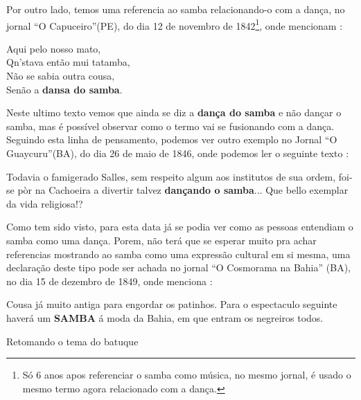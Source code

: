 Por outro lado, temos uma referencia ao samba relacionando-o com a dança, no jornal ``O Capuceiro''(PE),
do dia 12 de novembro de 1842\footnote{Só 6 anos apos referenciar o samba como música, 
no mesmo jornal, é usado o mesmo termo agora relacionado com a dança.}, 
onde mencionam \cite[pp. 5]{sambaperiodicoocapuceiro2}:
\begin{tcolorbox}[breakable,colback=colorlowgray,colframe=colorlowgray]%
Aqui pelo nosso mato,\\
Qn'stava então mui tatamba,\\
Não se sabia outra cousa,\\
Senão a \textbf{dansa do samba}.
\end{tcolorbox}
Neste ultimo texto vemos que ainda se diz a \textbf{dança do samba} e não dançar o samba,
mas é possível observar como o termo vai se fusionando com a dança.
Seguindo esta linha de pensamento, 
podemos ver outro exemplo no Jornal ``O Guaycuru''(BA), do dia 26 de maio de 1846,
onde podemos ler o seguinte texto \cite[pp. 2]{sambaperiodicooguaycuru}:
\begin{tcolorbox}[breakable,colback=colorlowgray,colframe=colorlowgray]%
Todavia o famigerado Salles, sem respeito algum aos institutos de sua ordem, 
foi-se pòr na Cachoeira a divertir talvez \textbf{dançando o samba}...
Que bello exemplar da vida religiosa!?
\end{tcolorbox}
Como tem sido visto, 
para esta data já se podia ver como as pessoas entendiam o samba como uma dança.
Porem, não terá que se esperar muito pra achar referencias mostrando ao samba
como uma expressão cultural em si mesma, 
uma declaração deste tipo pode ser achada no jornal ``O Cosmorama na Bahia'' (BA), 
no dia 15 de dezembro de 1849, onde menciona \cite[pp. 2]{sambaperiodicoocosmorama}:
\begin{tcolorbox}[breakable,colback=colorlowgray,colframe=colorlowgray]%
Cousa já muito antiga para engordar os patinhos. 
Para o espectaculo seguinte haverá um \textbf{SAMBA} á moda da Bahia, 
em que entram os negreiros todos.
\end{tcolorbox}

\PRLsep{*}
Retomando o tema do batuque

\PRLsep{*}


